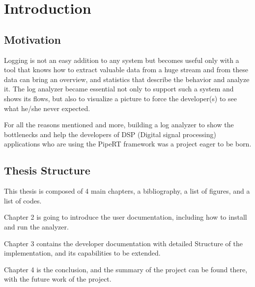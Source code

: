 \chapter{Introduction} %
\label{ch:intro}

\section{Motivation}
Logging is not an easy addition to any system but becomes useful only
with a tool that knows how to extract valuable data from a huge
stream and from these data can bring an overview, and
statistics that describe the behavior and analyze it. The log analyzer
became essential not only to support such a system and shows its flows,
but also to visualize a picture to force the developer(s) to see what
he/she never expected.

For all the reasons mentioned and more, building a log 
analyzer to show the bottlenecks and help the developers of DSP (Digital signal processing)
applications who are using the PipeRT framework was a project eager to be born.

\section{Thesis Structure}
This thesis is composed of 4 main chapters, a bibliography, 
a list of figures, and a list of codes.

Chapter 2 is going to introduce the user documentation, including
how to install and run the analyzer.

Chapter 3 contains the developer documentation with detailed Structure
of the implementation, and its capabilities to be extended.

Chapter 4 is the conclusion, and the summary of the project can be
found there, with the future work of the project.